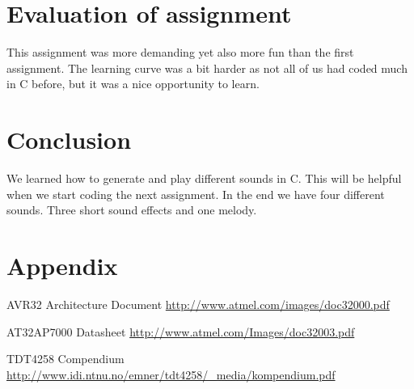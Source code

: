\documentclass[a4paper,11pt]{article}
\begin{document}
\section{Evaluation of assignment}
This assignment was more demanding yet also more fun than the first assignment. The learning curve was a bit harder as not all of us had coded much in C before, but it was a nice opportunity to learn.

\section{Conclusion}
We learned how to generate and play different sounds in C. This will be helpful when we start coding the next assignment. In the end we have four different sounds. Three short sound effects and one melody. 

\section{Appendix}

\footnotesize{  %
\begin{thebibliography}{N}

 AVR32 Architecture Document
\url{http://www.atmel.com/images/doc32000.pdf}

 AT32AP7000 Datasheet
\url{http://www.atmel.com/Images/doc32003.pdf}

 TDT4258 Compendium
\url{http://www.idi.ntnu.no/emner/tdt4258/_media/kompendium.pdf}

\end{thebibliography}  
}
\end{document}
